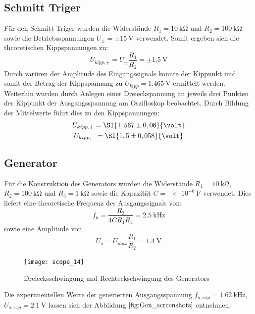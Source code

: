 \subsection{Schmitt Triger}
Für den Schmitt Triger wurden die Widerstände $R_1=\SI{10}{\kilo\ohm}$ und $R_2=\SI{100}{\kilo\ohm}$ sowie die Betriebsspannungen $U_{\pm}=\pm\SI{15}{\volt}$ verwendet.
Somit ergeben sich die theoretischen Kippspannungen zu:
\begin{equation}
U_{kipp,\pm}=U_{\pm}\frac{R_1}{R_2}=\pm\SI{1,5}{\volt}
\end{equation}
Durch variiren der Amplitude des Eingangssignals konnte der Kippunkt und somit der Betrag der Kippspannung zu $U_{kipp}=\SI{1,465}{\volt}$ ermittelt werden. Weiterhin wurden durch Anlegen einer Dreieckspannung an jeweils drei Punkten der Kippunkt der Ausgangsspannung am Oszilloskop beobachtet. Durch Bildung der Mittelwerte führt dies zu den Kippspannungen:
\begin{gather}
U_{kipp,+}=\SI{1,567\pm0,06}{\volt} \\
U_{kipp,-}=\SI{1,5\pm0,058}{\volt}
\end{gather}
\subsection{Generator}
Für die Konstruktion des Generators wurden die Widerstände $R_1=\SI{10}{\kilo\ohm}$, $R_2=\SI{100}{\kilo\ohm}$ und $R_3=\SI{1}{\kilo\ohm}$ sowie die Kapazität $C=\SI{e-6}{\farad}$ verwendet. Dies liefert eine theoretische Frequenz des Ausgangssignals von:
\begin{equation}
f_a=\frac{R_2}{4CR_1R_3}=\SI{2,5}{\kilo\hertz}
\end{equation}
sowie eine Amplitude von
\begin{equation}
U_a=U_{max}\frac{R_1}{R_2}=\SI{1,4}{\volt}
\end{equation}
\begin{figure}
\centering
\texttt{[image: scope\_14]}
\caption{Dreiecksschwingung und Rechteckschwingung des Generators}
\label{fig:Gen_screenshots}
\end{figure}
Die experimentellen Werte der generierten Ausgangsspannung $f_{a,exp}=\SI{1,62}{\kilo\hertz}$, $U_{a,exp}=\SI{2,1}{\volt}$ lassen sich der Abbildung $\ref{fig:Gen_screenshots}$ entnehmen. 
